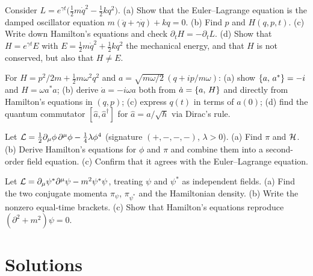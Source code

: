 \documentclass[11pt]{article}
\begin{document}
\begin{exercise}\label{ex:damped}
Consider $L=e^{\gamma t}\bigl(\tfrac12m\dot q^2-\tfrac12kq^2\bigr)$. (a) Show that the Euler--Lagrange equation is the damped oscillator equation $m(\ddot q+\gamma\dot q)+kq=0$. (b) Find $p$ and $H(q,p,t)$. (c) Write down Hamilton's equations and check $\partial_tH=-\partial_tL$. (d) Show that $H=e^{\gamma t}E$ with $E=\tfrac12m\dot q^2+\tfrac12kq^2$ the mechanical energy, and that $H$ is not conserved, but also that $H\ne E$.
\end{exercise}

\begin{exercise}\label{ex:ladder}
For $H=p^2/2m+\tfrac12m\omega^2q^2$ and $a=\sqrt{m\omega/2}\,(q+ip/m\omega)$: (a) show $\left\{a,\,a^*\right\}=-i$ and $H=\omega a^*a$; (b) derive $\dot a=-i\omega a$ both from $\dot a=\left\{a,\,H\right\}$ and directly from Hamilton's equations in $(q,p)$; (c) express $q(t)$ in terms of $a(0)$; (d) find the quantum commutator $[\hat a,\hat a^\dagger]$ for $\hat a=a/\sqrt\hbar$ via Dirac's rule.
\end{exercise}

\begin{exercise}\label{ex:phi4}
Let $\mathcal{L}=\tfrac12\partial_\mu\phi\,\partial^\mu\phi-\tfrac14\lambda\phi^4$ (signature $(+,-,-,-)$, $\lambda>0$). (a) Find $\pi$ and $\mathcal{H}$. (b) Derive Hamilton's equations for $\phi$ and $\pi$ and combine them into a second-order field equation. (c) Confirm that it agrees with the Euler--Lagrange equation.
\end{exercise}

\begin{exercise}\label{ex:complex}
Let $\mathcal{L}=\partial_\mu\psi^*\partial^\mu\psi-m^2\psi^*\psi$, treating $\psi$ and $\psi^*$ as independent fields. (a) Find the two conjugate momenta $\pi_\psi$, $\pi_{\psi^*}$ and the Hamiltonian density. (b) Write the nonzero equal-time brackets. (c) Show that Hamilton's equations reproduce $(\partial^2+m^2)\psi=0$.
\end{exercise}

\section{Solutions}
\end{document}
